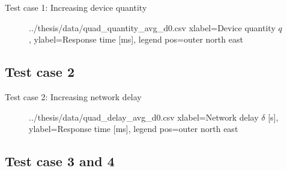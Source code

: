 \documentclass{beamer}
\begin{document}
    \begin{frame}{Test case 1: Increasing device quantity}

        \begin{figure}[h!]
            \centering
            \performanceplot
            {../thesis/data/quad_quantity_avg_d0.csv}
            {
                xlabel=Device quantity $q$,
                ylabel={Response time [ms]},
                legend pos=outer north east
            }
        \end{figure}

    \end{frame}

    \subsection{Test case 2}

%
%

    \begin{frame}{Test case 2: Increasing network delay}

        \begin{figure}[h!]
            \centering
            \performanceplot
            {../thesis/data/quad_delay_avg_d0.csv}
            {
                xlabel={Network delay $\delta$ [s]},
                ylabel={Response time [ms]},
                legend pos=outer north east
            }
        \end{figure}

    \end{frame}

    \subsection{Test case 3 and 4}
\end{document}
